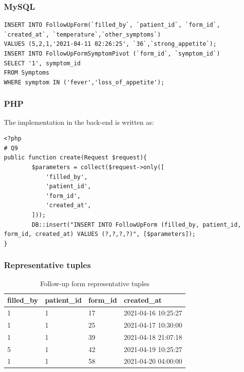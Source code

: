 \documentclass{article}
\begin{document}
\subsubsection{MySQL}
\begin{verbatim}
INSERT INTO FollowUpForm(`filled_by`, `patient_id`, `form_id`, `created_at`, `temperature`,`other_symptoms`)
VALUES (5,2,1,'2021-04-11 02:26:25', `36`,`strong_appetite`);
INSERT INTO FollowUpFormSymptomPivot (`form_id`, `symptom_id`) 
SELECT '1', symptom_id
FROM Symptoms 
WHERE symptom IN ('fever','loss_of_appetite');
\end{verbatim}

\subsubsection{PHP}
The implementation in the back-end is written as:\\
\begin{verbatim}
<?php
# Q9
public function create(Request $request){
        $parameters = collect($request->only([
            'filled_by',
            'patient_id',
            'form_id',
            'created_at',
        ]));
        DB::insert("INSERT INTO FollowUpForm (filled_by, patient_id, form_id, created_at) VALUES (?,?,?,?)", [$parameters]);
}
\end{verbatim}
\subsubsection{Representative tuples}
\begin{table}[ht]
\centering
\begin{tabular}{|l|l|l|l|} 
        \hline
        filled\_by & patient\_id & form\_id & created\_at \\
        \hline 
        1&1& 17 & 2021-04-16 10:25:27 \\
        1&1 & 25 & 2021-04-17 10:30:00\\
        1&1 & 39 & 2021-04-18 21:07:18\\
        5&1 & 42 & 2021-04-19 10:25:27\\
        1&1 & 58 & 2021-04-20 04:00:00\\
        \hline
\end{tabular}
\caption{Follow-up form representative tuples}
\end{table}
\end{document}
